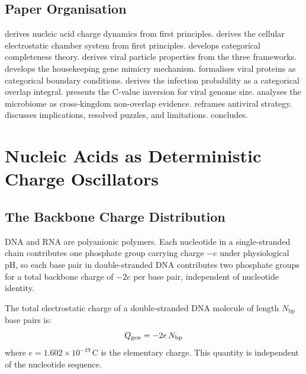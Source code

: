 \subsection{Paper Organisation}

 derives nucleic acid charge dynamics from first principles.  derives the cellular electrostatic chamber system from first principles.  develops categorical completeness theory.  derives viral particle properties from the three frameworks.  develops the housekeeping gene mimicry mechanism.  formalises viral proteins as categorical boundary conditions.  derives the infection probability as a categorical overlap integral.  presents the C-value inversion for viral genome size.  analyses the microbiome as cross-kingdom non-overlap evidence.  reframes antiviral strategy.  discusses implications, resolved puzzles, and limitations.  concludes.

\section{Nucleic Acids as Deterministic Charge Oscillators}
\label{v:sec:nacid}

\subsection{The Backbone Charge Distribution}

DNA and RNA are polyanionic polymers. Each nucleotide in a single-stranded chain contributes one phosphate group carrying charge $-e$ under physiological pH, so each base pair in double-stranded DNA contributes two phosphate groups for a total backbone charge of $-2e$ per base pair, independent of nucleotide identity.

\begin{theorem}
\label{v:thm:genome_charge}
The total electrostatic charge of a double-stranded DNA molecule of length $N_{\mathrm{bp}}$ base pairs is:
\begin{equation}
  Q_{\mathrm{gen}} = -2e \, N_{\mathrm{bp}}
  \label{v:eq:genome_charge}
\end{equation}
where $e = 1.602 \times 10^{-19}$\,C is the elementary charge. This quantity is independent of the nucleotide sequence.
\end{theorem}


